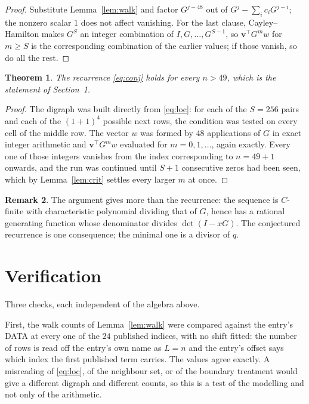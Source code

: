 \documentclass[11pt,a4paper]{article}
\theoremstyle{plain}
\newtheorem{theorem}{Theorem}
\theoremstyle{definition}
\newtheorem{remark}[theorem]{Remark}
\begin{document}
\begin{proof}
Substitute Lemma~\ref{lem:walk} and factor $G^{j-48}$ out of
$G^{j}-\sum_ic_iG^{j-i}$; the nonzero scalar $1$ does not affect
vanishing. For the last clause, Cayley--Hamilton makes $G^{S}$ an integer combination of
$I,G,\dots,G^{S-1}$, so $\mathbf{v}^{\!\top}G^{m}w$ for $m\ge S$ is the corresponding
combination of the earlier values; if those vanish, so do all the rest.
\end{proof}

\begin{theorem}
The recurrence \eqref{eq:conj} holds for every $n>49$, which is the statement of
Section~1.
\end{theorem}

\begin{proof}
The digraph was built directly from \eqref{eq:loc}: for each of the $S=256$ pairs and each
of the $(1+1)^{4}$ possible next rows, the condition was tested on every cell of
the middle row. The vector $w$ was formed by $48$ applications of $G$ in exact integer
arithmetic and $\mathbf{v}^{\!\top}G^{m}w$ evaluated for $m=0,1,\dots$, again exactly.
Every one of those integers vanishes from the index corresponding to $n=49+1$ onwards,
and the run was continued until $S+1$ consecutive zeros had been seen, which by
Lemma~\ref{lem:crit} settles every larger $m$ at once.
\end{proof}

\begin{remark}
The argument gives more than the recurrence: the sequence is $C$-finite with characteristic
polynomial dividing that of $G$, hence has a rational generating function whose denominator
divides $\det(I-xG)$. The conjectured recurrence is one consequence; the minimal one is a
divisor of $q$.
\end{remark}

\section{Verification}

Three checks, each independent of the algebra above.

First, the walk counts of Lemma~\ref{lem:walk} were compared against the entry's DATA at
every one of the $24$ published indices, with no shift fitted: the number of rows is
read off the entry's own name as $L=n$ and the entry's offset says which index the first
published term carries. The values agree exactly. A misreading of \eqref{eq:loc}, of the
neighbour set, or of the boundary treatment would give a different digraph and different
counts, so this is a test of the modelling and not only of the arithmetic.
\end{document}
